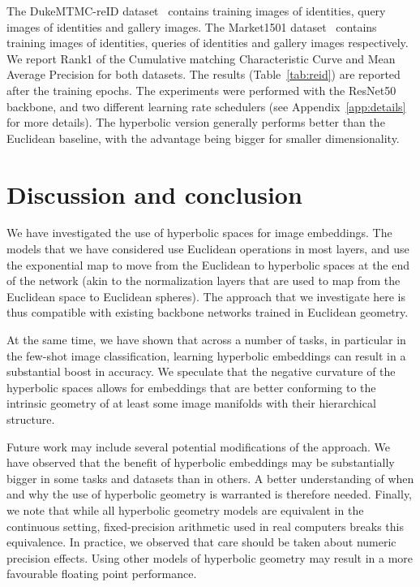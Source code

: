 \documentclass[10pt,twocolumn,letterpaper]{article}
\begin{document}
 
The DukeMTMC-reID dataset~\cite{ristani2016MTMC,zheng2017unlabeled} contains  training images of  identities,  query images of  identities and  gallery images. The Market1501 dataset~\cite{zheng2015scalable} contains  training images of  identities,  queries of  identities and  gallery images respectively. We report Rank1 of the Cumulative matching Characteristic Curve and Mean Average Precision for both datasets. The results (Table~\ref{tab:reid}) are reported after the  training epochs. The experiments were performed with the ResNet50 backbone, and two different learning rate schedulers (see Appendix~\ref{app:details} for more details). The hyperbolic version generally performs better than the Euclidean baseline, with the advantage being bigger for smaller dimensionality. 

 \section{Discussion and conclusion}\label{sec:conclusion}
We have investigated the use of hyperbolic spaces for image embeddings. The models that we have considered use Euclidean operations in most layers, and use the exponential map to move from the Euclidean to hyperbolic spaces at the end of the network (akin to the normalization layers that are used to map from the Euclidean space to Euclidean spheres). The approach that we investigate here is thus compatible with existing backbone networks trained in Euclidean geometry.

At the same time, we have shown that across a number of tasks, in particular in the few-shot image classification, learning hyperbolic embeddings can result in a substantial boost in accuracy. We speculate that the negative curvature of the hyperbolic spaces allows for embeddings that are better conforming to the intrinsic geometry of at least some image manifolds with their hierarchical structure.

Future work may include several potential modifications of the approach. We have observed that the benefit of hyperbolic embeddings may be substantially bigger in some tasks and datasets than in others. A better understanding of when and why the use of hyperbolic geometry is warranted is therefore needed. Finally, we note that while all hyperbolic geometry models are equivalent in the continuous setting, fixed-precision arithmetic used in real computers breaks this equivalence. In practice, we observed that care should be taken about numeric precision effects. Using other models of hyperbolic geometry may result in a more favourable floating point performance.
\end{document}
